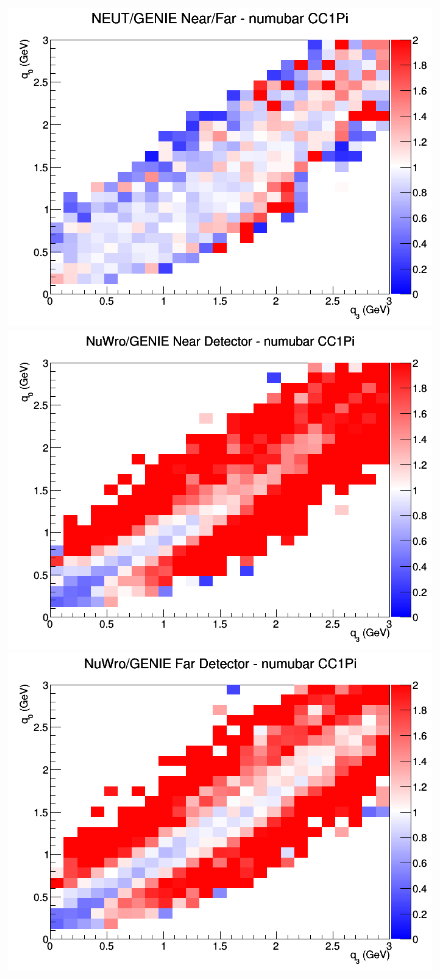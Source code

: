 \begin{figure}[h]
\endminipage
{}
\includegraphics[width=\linewidth]{eff_q0_q3/GAr/ratios/CC1Pi_NEUT_GENIE_numubar_NF_q3_q0.png}
\endminipage
\newline
{}
\includegraphics[width=\linewidth]{eff_q0_q3/GAr/ratios/CC1Pi_NuWro_GENIE_numubar_near_q3_q0.png}
\endminipage
{}
\includegraphics[width=\linewidth]{eff_q0_q3/GAr/ratios/CC1Pi_NuWro_GENIE_numubar_far_q3_q0.png}

\end{figure}
